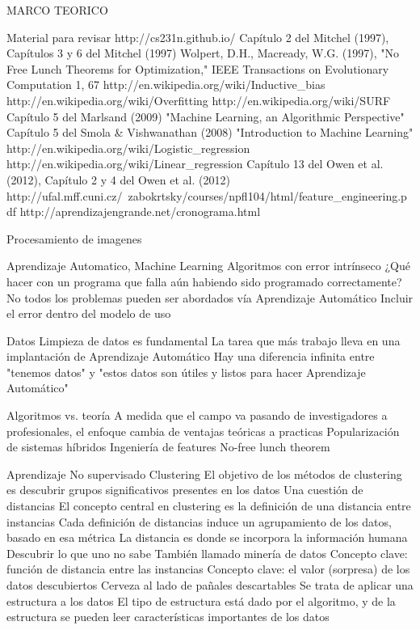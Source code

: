 MARCO TEORICO

Material para revisar
http://cs231n.github.io/
Capítulo 2 del Mitchel (1997), Capítulos 3 y 6 del Mitchel (1997)
Wolpert, D.H., Macready, W.G. (1997), "No Free Lunch Theorems for Optimization," IEEE Transactions on Evolutionary Computation 1, 67
http://en.wikipedia.org/wiki/Inductive_bias
http://en.wikipedia.org/wiki/Overfitting
http://en.wikipedia.org/wiki/SURF
Capítulo 5 del Marlsand (2009) "Machine Learning, an Algorithmic Perspective"
Capítulo 5 del Smola & Vishwanathan (2008) "Introduction to Machine Learning"
http://en.wikipedia.org/wiki/Logistic_regression
http://en.wikipedia.org/wiki/Linear_regression
Capítulo 13 del Owen et al. (2012), Capítulo 2 y 4 del Owen et al. (2012)
http://ufal.mff.cuni.cz/~zabokrtsky/courses/npfl104/html/feature_engineering.pdf
http://aprendizajengrande.net/cronograma.html


Procesamiento de imagenes


Aprendizaje Automatico, Machine Learning
Algoritmos con error intrínseco
¿Qué hacer con un programa que falla aún habiendo sido programado correctamente?
No todos los problemas pueden ser abordados vía Aprendizaje Automático
Incluir el error dentro del modelo de uso

Datos
Limpieza de datos es fundamental
La tarea que más trabajo lleva en una implantación de Aprendizaje Automático
Hay una diferencia infinita entre "tenemos datos" y "estos datos son útiles y listos para hacer Aprendizaje Automático"


Algoritmos vs. teoría
A medida que el campo va pasando de investigadores a profesionales, el enfoque cambia de ventajas teóricas a practicas
Popularización de sistemas híbridos
Ingeniería de features
No-free lunch theorem


Aprendizaje No supervisado 
Clustering
El objetivo de los métodos de clustering es descubrir grupos significativos presentes en los datos
Una cuestión de distancias
El concepto central en clustering es la definición de una distancia entre instancias
Cada definición de distancias induce un agrupamiento de los datos, basado en esa métrica
La distancia es donde se incorpora la información humana
Descubrir lo que uno no sabe
También llamado minería de datos
Concepto clave: función de distancia entre las instancias
Concepto clave: el valor (sorpresa) de los datos descubiertos
Cerveza al lado de pañales descartables
Se trata de aplicar una estructura a los datos
El tipo de estructura está dado por el algoritmo, y de la estructura se pueden leer características importantes de los datos

